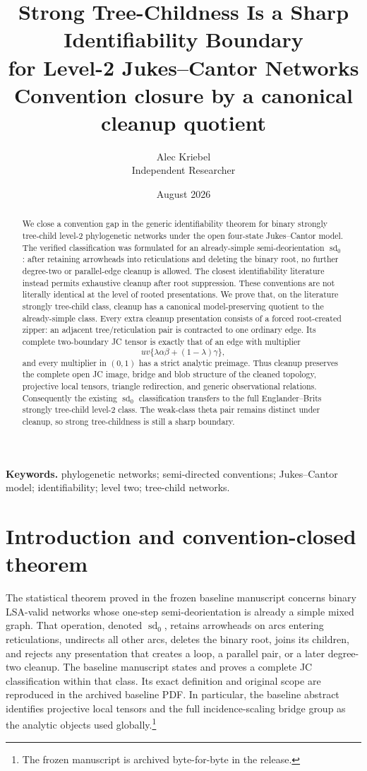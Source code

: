 \documentclass[11pt]{article}
\title{Strong Tree-Childness Is a Sharp Identifiability Boundary\\for Level-2 Jukes--Cantor Networks\\[2mm]\large Convention closure by a canonical cleanup quotient}
\author{Alec Kriebel\\\small Independent Researcher}
\date{August 2026}
\theoremstyle{remark}\newtheorem{remark}[theorem]{Remark}
\begin{document}
\maketitle
\begin{abstract}
We close a convention gap in the generic identifiability theorem for binary strongly tree-child level-2 phylogenetic networks under the open four-state Jukes--Cantor model.  The verified classification was formulated for an already-simple semi-deorientation $\operatorname{sd}_0$: after retaining arrowheads into reticulations and deleting the binary root, no further degree-two or parallel-edge cleanup is allowed.  The closest identifiability literature instead permits exhaustive cleanup after root suppression.  These conventions are not literally identical at the level of rooted presentations.  We prove that, on the literature strongly tree-child class, cleanup has a canonical model-preserving quotient to the already-simple class.  Every extra cleanup presentation consists of a forced root-created zipper: an adjacent tree/reticulation pair is contracted to one ordinary edge.  Its complete two-boundary JC tensor is exactly that of an edge with multiplier
\[
uv\{\lambda\alpha\beta+(1-\lambda)\gamma\},
\]
and every multiplier in $(0,1)$ has a strict analytic preimage.  Thus cleanup preserves the complete open JC image, bridge and blob structure of the cleaned topology, projective local tensors, triangle redirection, and generic observational relations.  Consequently the existing $\operatorname{sd}_0$ classification transfers to the full Englander--Brits strongly tree-child level-2 class.  The weak-class theta pair remains distinct under cleanup, so strong tree-childness is still a sharp boundary.
\end{abstract}
\noindent\textbf{Keywords.} phylogenetic networks; semi-directed conventions; Jukes--Cantor model; identifiability; level two; tree-child networks.

\section{Introduction and convention-closed theorem}
The statistical theorem proved in the frozen baseline manuscript concerns binary LSA-valid networks whose one-step semi-deorientation is already a simple mixed graph.  That operation, denoted $\operatorname{sd}_0$, retains arrowheads on arcs entering reticulations, undirects all other arcs, deletes the binary root, joins its children, and rejects any presentation that creates a loop, a parallel pair, or a later degree-two cleanup.  The baseline manuscript states and proves a complete JC classification within that class.  Its exact definition and original scope are reproduced in the archived baseline PDF.  In particular, the baseline abstract identifies projective local tensors and the full incidence-scaling bridge group as the analytic objects used globally.\footnote{The frozen manuscript is archived byte-for-byte in the release.}
\end{document}
